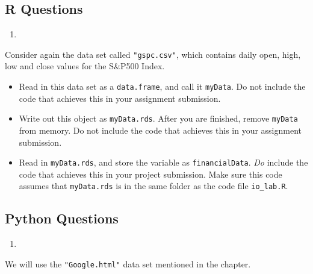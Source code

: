 \documentclass[
  12pt,
  krantz2]{krantz}
\providecommand{\tightlist}{%
  \setlength{\itemsep}{0pt}\setlength{\parskip}{0pt}}
\begin{document}
\hypertarget{r-questions-7}{%
\subsection{R Questions}\label{r-questions-7}}

\begin{enumerate}
\def\labelenumi{\arabic{enumi}.}
\tightlist
\item
\end{enumerate}

Consider again the data set called \texttt{"gspc.csv"}, which contains daily open, high, low and close values for the S\&P500 Index.

\begin{itemize}
\tightlist
\item
  Read in this data set as a \texttt{data.frame}, and call it \texttt{myData}. Do not include the code that achieves this in your assignment submission.
\item
  Write out this object as \texttt{myData.rds}. After you are finished, remove \texttt{myData} from memory. Do not include the code that achieves this in your assignment submission.
\item
  Read in \texttt{myData.rds}, and store the variable as \texttt{financialData}. \emph{Do} include the code that achieves this in your project submission. Make sure this code assumes that \texttt{myData.rds} is in the same folder as the code file \texttt{io\_lab.R}.
\end{itemize}

\hypertarget{python-questions-7}{%
\subsection{Python Questions}\label{python-questions-7}}

\begin{enumerate}
\def\labelenumi{\arabic{enumi}.}
\tightlist
\item
\end{enumerate}

We will use the \texttt{"Google.html"} data set mentioned in the chapter.
\end{document}
